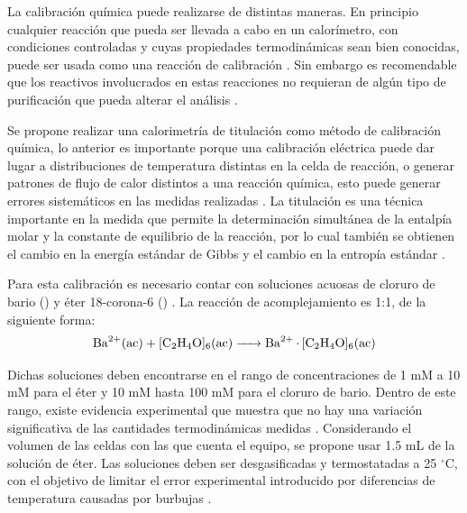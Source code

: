 	La calibración química puede realizarse de distintas maneras. En principio cualquier reacción que pueda ser llevada a cabo en un calorímetro, con condiciones controladas y cuyas propiedades termodinámicas sean bien conocidas, puede ser usada como una reacción de calibración \cite{wadso2001standards}. Sin embargo es recomendable que los reactivos involucrados en estas reacciones no requieran de algún tipo de purificación que pueda alterar el análisis \cite{wadso2001standards}.
	
	Se propone realizar una calorimetría de titulación como método de calibración química, lo anterior es importante porque una calibración eléctrica puede dar lugar a distribuciones de temperatura distintas en la celda de reacción, o generar patrones de flujo de calor distintos a una reacción química, esto puede generar errores sistemáticos en las medidas realizadas \cite{wadso2001standards}. La titulación es una técnica importante en la medida que permite la determinación simultánea de la entalpía molar y la constante de equilibrio de la reacción, por lo cual también se obtienen el cambio en la energía estándar de Gibbs y el cambio en la entropía estándar \cite{wadso2001standards}. 
	
	Para esta calibración es necesario contar con soluciones acuosas de cloruro de bario () y éter 18-corona-6 () \cite{tellinghuisen2007optimizing, mizoue2004calorimetric, wadso2001standards}. La reacción de acomplejamiento es 1:1, de la siguiente forma:
	\begin{equation}
		\ce{Ba^{2+}(ac) + [C2H4O]6(ac) -> Ba^{2+}.[C2H4O]6(ac)}
	\end{equation}
	
	Dichas soluciones deben encontrarse en el rango de concentraciones de 1 mM a 10 mM para el éter y 10 mM hasta 100 mM para el cloruro de bario. Dentro de este rango, existe evidencia experimental que muestra que no hay una variación significativa de las cantidades termodinámicas medidas \cite{wadso2001standards, mizoue2004calorimetric}. Considerando el volumen de las celdas con las que cuenta el equipo, se propone usar 1.5 mL de la solución de éter. Las soluciones deben ser desgasificadas y  termostatadas a 25 $^\circ$C, con el objetivo de limitar el error experimental introducido por diferencias de temperatura causadas por burbujas \cite{mizoue2004calorimetric, tellinghuisen2007optimizing, duff2011isothermal}. 
	
